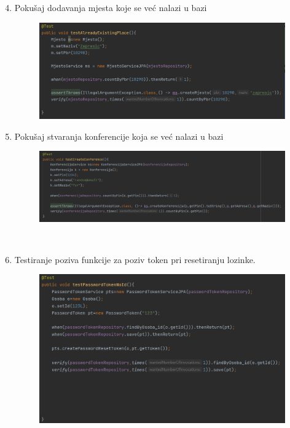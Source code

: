\begin{enumerate}
    \setcounter{enumi}{3}

    \item Pokušaj dodavanja mjesta koje se već nalazi u bazi
    \begin{figure}[H]
        \includegraphics[scale=0.30]{slike/deploy/backTest4.png}
        \centering
        \label{fig:promjene4}
    \end{figure}

    \item Pokušaj stvaranja konferencije koja se već nalazi u bazi
    \begin{figure}[H]
        \includegraphics[scale=0.30]{slike/deploy/backTest5.png}
        \centering
        \label{fig:promjene5}
    \end{figure}
    \\
    \item Testiranje poziva funkcije za poziv token pri resetiranju lozinke.
    \begin{figure}[H]
        \includegraphics[scale=0.30]{slike/deploy/backTest6.png}
        \centering
        \label{fig:promjene6}
    \end{figure}
\end{enumerate}
